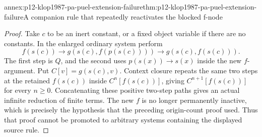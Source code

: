 \begin{annexitem}{annex:p12-klop1987-pa-puel-extension-failure}{thm:p12-klop1987-pa-puel-extension-failure}{A companion rule that repeatedly reactivates the blocked f-node}
\begin{proof}
Take \(c\) to be an inert constant, or a fixed object variable
if there are no constants. In the enlarged ordinary system perform
\[
 f(s(c))\to g(s(c),f(p(s(c))))\to g(s(c),f(s(c))).
\]
The first step is \(Q\), and the second uses \(p(s(x))\to s(x)\)
inside the new \(f\)-argument. Put \(C[v]=g(s(c),v)\).
Context closure repeats the same two steps at the retained
\(f(s(c))\) inside \(C^n[f(s(c))]\), giving
\(C^{n+1}[f(s(c))]\) for every \(n\geq0\). Concatenating
these positive two-step paths gives an actual infinite reduction
of finite terms. The new \(f\) is no longer permanently inactive,
which is precisely the hypothesis that the preceding origin-count
proof used. Thus that proof cannot be promoted to arbitrary
systems containing the displayed source rule.
\end{proof}
\end{annexitem}
